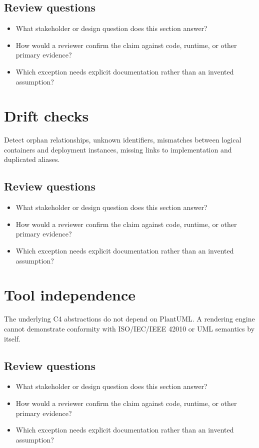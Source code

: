 \documentclass[10pt,letterpaper]{article}
\begin{document}
\subsection{Review questions}
\begin{itemize}
\item What stakeholder or design question does this section answer?
\item How would a reviewer confirm the claim against code, runtime, or other primary evidence?
\item Which exception needs explicit documentation rather than an invented assumption?
\end{itemize}

\section{Drift checks}
Detect orphan relationships, unknown identifiers, mismatches between logical containers and deployment instances, missing links to implementation and duplicated aliases.


\subsection{Review questions}
\begin{itemize}
\item What stakeholder or design question does this section answer?
\item How would a reviewer confirm the claim against code, runtime, or other primary evidence?
\item Which exception needs explicit documentation rather than an invented assumption?
\end{itemize}

\section{Tool independence}
The underlying C4 abstractions do not depend on PlantUML. A rendering engine cannot demonstrate conformity with ISO/IEC/IEEE 42010 or UML semantics by itself.


\subsection{Review questions}
\begin{itemize}
\item What stakeholder or design question does this section answer?
\item How would a reviewer confirm the claim against code, runtime, or other primary evidence?
\item Which exception needs explicit documentation rather than an invented assumption?
\end{itemize}
\end{document}
